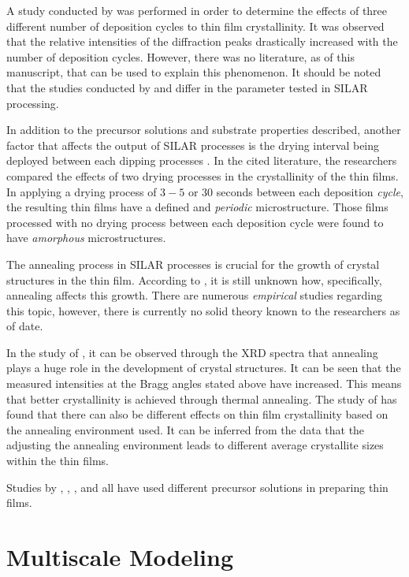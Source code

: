 A study conducted by  was performed in order to determine the effects of three different number of deposition cycles to thin film crystallinity.
It was observed that the relative intensities of the diffraction peaks drastically increased with the number of deposition cycles.
However, there was no literature, as of this manuscript, that can be used to explain this phenomenon.
It should be noted that the studies conducted by  and  differ in the parameter tested in SILAR processing.

In addition to the precursor solutions and substrate properties described, another factor that affects the output of SILAR processes is the drying interval being deployed between each dipping processes \cite{gao08}.
In the cited literature, the researchers compared the effects of two drying processes in the crystallinity of the thin films.
In applying a drying process of $3-5$ or $30$ seconds between each deposition \emph{cycle}, the resulting thin films have a defined and \emph{periodic} microstructure.
Those films processed with no drying process between each deposition cycle were found to have \emph{amorphous} microstructures.

The annealing process in SILAR processes is crucial for the growth of crystal structures in the thin film.
According to , it is still unknown how, specifically, annealing affects this growth.
There are numerous \emph{empirical} studies regarding this topic, however, there is currently no solid theory known to the researchers as of date.

In the study of , it can be observed through the XRD spectra that annealing plays a huge role in the development of crystal structures.
It can be seen that the measured intensities at the Bragg angles stated above have increased.
This means that better crystallinity is achieved through thermal annealing.
The study of  has found that there can also be different effects on thin film crystallinity based on the annealing environment used.
It can be inferred from the data that the adjusting the annealing environment leads to different average crystallite sizes within the thin films.

Studies by , , , and  all have used different precursor solutions in preparing thin films.

\section{Multiscale Modeling}

